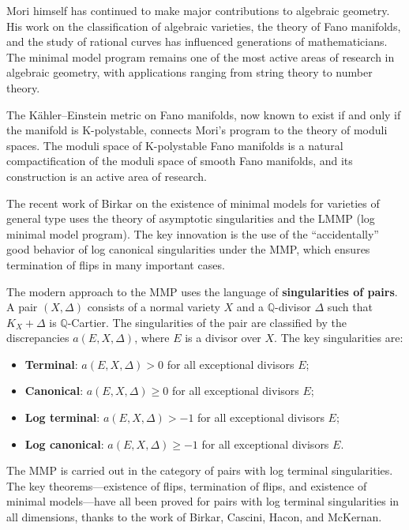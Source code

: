 Mori himself has continued to make major contributions to algebraic geometry.
His work on the classification of algebraic varieties, the theory of Fano
manifolds, and the study of rational curves has influenced generations of
mathematicians. The minimal model program remains one of the most active areas
of research in algebraic geometry, with applications ranging from string theory
to number theory.

The K\"ahler--Einstein metric on Fano manifolds, now known to exist if and only
if the manifold is K-polystable, connects Mori's program to the theory of moduli
spaces. The moduli space of K-polystable Fano manifolds is a natural
compactification of the moduli space of smooth Fano manifolds, and its
construction is an active area of research.

The recent work of Birkar on the existence of minimal models for varieties of
general type uses the theory of asymptotic singularities and the LMMP (log
minimal model program). The key innovation is the use of the ``accidentally''
good behavior of log canonical singularities under the MMP, which ensures
termination of flips in many important cases.

The modern approach to the MMP uses the language of \textbf{singularities of pairs}.
A pair $(X, \Delta)$ consists of a normal variety $X$ and a $\mathbb{Q}$-divisor
$\Delta$ such that $K_X + \Delta$ is $\mathbb{Q}$-Cartier. The singularities of
the pair are classified by the discrepancies $a(E, X, \Delta)$, where $E$ is a
divisor over $X$. The key singularities are:
\begin{itemize}
    \item \textbf{Terminal}: $a(E, X, \Delta) > 0$ for all exceptional divisors $E$;
    \item \textbf{Canonical}: $a(E, X, \Delta) \geq 0$ for all exceptional divisors $E$;
    \item \textbf{Log terminal}: $a(E, X, \Delta) > -1$ for all exceptional divisors $E$;
    \item \textbf{Log canonical}: $a(E, X, \Delta) \geq -1$ for all exceptional divisors $E$.
\end{itemize}

The MMP is carried out in the category of pairs with log terminal singularities.
The key theorems---existence of flips, termination of flips, and existence of
minimal models---have all been proved for pairs with log terminal singularities
in all dimensions, thanks to the work of Birkar, Cascini, Hacon, and McKernan.

